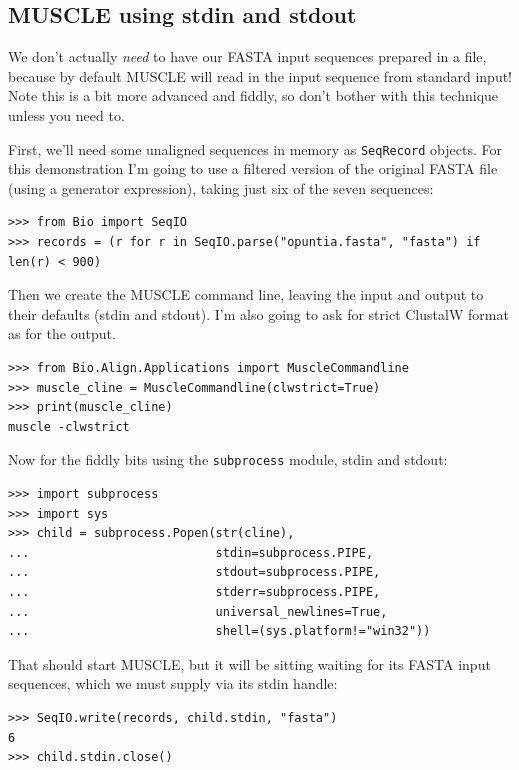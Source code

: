 \documentclass{report}
\begin{document}
\subsection{MUSCLE using stdin and stdout}

We don't actually \emph{need} to have our FASTA input sequences prepared in a file,
because by default MUSCLE will read in the input sequence from standard input!
Note this is a bit more advanced and fiddly, so don't bother with this technique
unless you need to.

First, we'll need some unaligned sequences in memory as \verb|SeqRecord| objects.
For this demonstration I'm going to use a filtered version of the original FASTA
file (using a generator expression), taking just six of the seven sequences:

\begin{verbatim}
>>> from Bio import SeqIO
>>> records = (r for r in SeqIO.parse("opuntia.fasta", "fasta") if len(r) < 900)
\end{verbatim}

Then we create the MUSCLE command line, leaving the input and output to their
defaults (stdin and stdout). I'm also going to ask for strict ClustalW format
as for the output.

\begin{verbatim}
>>> from Bio.Align.Applications import MuscleCommandline
>>> muscle_cline = MuscleCommandline(clwstrict=True)
>>> print(muscle_cline)
muscle -clwstrict
\end{verbatim}

Now for the fiddly bits using the \verb|subprocess| module, stdin and stdout:

\begin{verbatim}
>>> import subprocess
>>> import sys
>>> child = subprocess.Popen(str(cline),
...                          stdin=subprocess.PIPE,
...                          stdout=subprocess.PIPE,
...                          stderr=subprocess.PIPE,
...                          universal_newlines=True,
...                          shell=(sys.platform!="win32"))                     
\end{verbatim}

That should start MUSCLE, but it will be sitting waiting for its FASTA input
sequences, which we must supply via its stdin handle:

\begin{verbatim}
>>> SeqIO.write(records, child.stdin, "fasta")
6
>>> child.stdin.close()
\end{verbatim}
\end{document}
